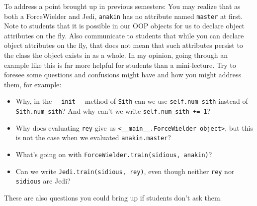\begin{questionmeta}
To address a point brought up in previous semesters: You may realize that as both a ForceWielder and Jedi, \lstinline{anakin} has no attribute named \lstinline{master} at first. Note to students that it is possible in our OOP objects for us to declare object attributes on the fly. Also communicate to students that while you can declare object attributes on the fly, that does not mean that such attributes persist to the class the object exists in as a whole.
\newline
In my opinion, going through an example like this is far more helpful for students than a mini-lecture. Try to foresee some questions and confusions might have and how you might address them, for example:
\begin{itemize}
    \item Why, in the \lstinline{__init__} method of \lstinline{Sith} can we use \lstinline{self.num_sith} instead of \lstinline{Sith.num_sith}? And why can't we write \lstinline{self.num_sith += 1}?
    \item Why does evaluating \lstinline{rey} give us \lstinline{<__main__.ForceWielder object>}, but this is not the case when we evaluated \lstinline{anakin.master}? 
    \item What's going on with \lstinline{ForceWielder.train(sidious, anakin)}? 
    \item Can we write \lstinline{Jedi.train(sidious, rey)}, even though neither \lstinline{rey} nor \lstinline{sidious} are Jedi? 
\end{itemize}
These are also questions you could bring up if students don't ask them. 
\end{questionmeta}